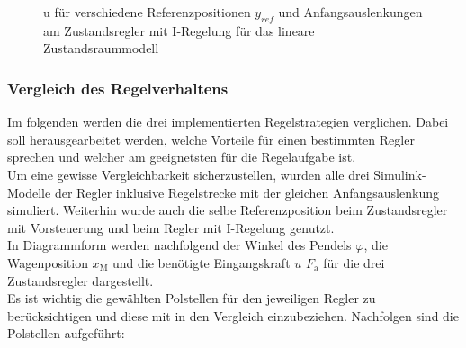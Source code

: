 \begin{figure}[H]
    \centering
    \caption[u für Regler mit I-Regelung (linear)]{u für verschiedene Referenzpositionen $y_{ref}$ und Anfangsauslenkungen am Zustandsregler mit I-Regelung für das lineare Zustandsraummodell}
    \label{fig:Bild24}
\end{figure}

\subsubsection{Vergleich des Regelverhaltens}

Im folgenden werden die drei implementierten Regelstrategien verglichen. Dabei soll herausgearbeitet werden, welche Vorteile für einen bestimmten Regler sprechen und welcher am geeignetsten für die Regelaufgabe ist. \\
Um eine gewisse Vergleichbarkeit sicherzustellen, wurden alle drei Simulink-Modelle der Regler inklusive Regelstrecke mit der gleichen Anfangsauslenkung simuliert. Weiterhin wurde auch die selbe Referenzposition beim Zustandsregler mit Vorsteuerung und beim Regler mit I-Regelung genutzt. \\
In Diagrammform werden nachfolgend der Winkel des Pendels $\varphi$, die Wagenposition $x_{\mathrm{M}}$ und die benötigte Eingangskraft $u$ \bzw $F_{\mathrm{a}}$ für die drei Zustandsregler dargestellt. \\
Es ist wichtig die gewählten Polstellen für den jeweiligen Regler zu berücksichtigen und diese mit in den Vergleich einzubeziehen. Nachfolgen sind die Polstellen aufgeführt:

